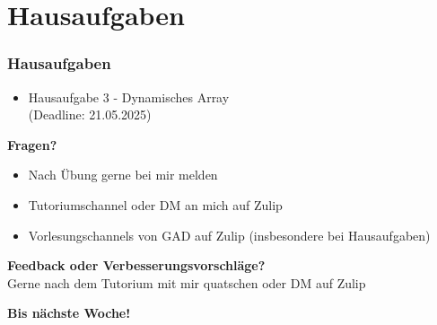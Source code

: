 \documentclass{beamer}
\begin{document}
\section{Hausaufgaben}
\begin{frame}
	\frametitle{Hausaufgaben}
	\begin{itemize}
		\item Hausaufgabe 3 - Dynamisches Array \\
		      (Deadline: 21.05.2025)
	\end{itemize}
\end{frame}

\begin{frame}
	\textbf{Fragen?}
	\begin{itemize}
		\item Nach Übung gerne bei mir melden
		\item Tutoriumschannel oder DM an mich auf Zulip
		\item Vorlesungschannels von GAD auf Zulip (insbesondere bei Hausaufgaben)
	\end{itemize}

	\medskip
	\textbf{Feedback oder Verbesserungsvorschläge?} \\
	Gerne nach dem Tutorium mit mir quatschen oder DM auf Zulip

	\medskip
	\textbf{Bis nächste Woche!}
\end{frame}

\end{document}
